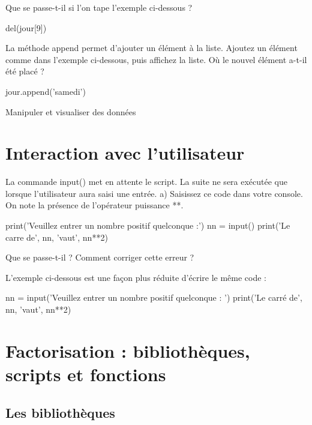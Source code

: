  Que se passe-t-il si l'on tape l'exemple ci-dessous ?

\begin{python}
del(jour[9])
\end{python}



 La méthode append permet d'ajouter un élément à la liste. Ajoutez un élément comme dans l'exemple ci-dessous, puis affichez la liste. O\`u le nouvel élément a-t-il été placé ?

\begin{python}
jour.append('samedi')
\end{python}


Manipuler et visualiser des données
\section{Interaction avec l'utilisateur}

La commande input() met en attente le script. La suite ne sera exécutée que lorsque l'utilisateur aura saisi une entrée.
a) Saisissez ce code dans votre console. On note la présence de l'opérateur puissance **.

\begin{python}
print('Veuillez entrer un nombre positif quelconque :')
nn = input()
print('Le carre de', nn, 'vaut', nn**2)
\end{python}

Que se passe-t-il ? Comment corriger cette erreur ?

L'exemple ci-dessous est une fa\c con plus réduite d'écrire le même code :
\begin{python}
nn = input('Veuillez entrer un nombre positif quelconque : ')
print('Le carré de', nn, 'vaut', nn**2)
\end{python}


\section{Factorisation : bibliothèques, scripts et fonctions}

\subsection*{Les bibliothèques}


